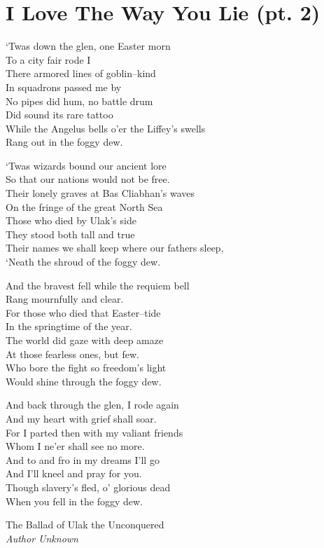 \chapter{I Love The Way You Lie (pt. 2)}
\begin{quotePoem}{
‘Twas down the glen, one Easter morn\\
To a city fair rode I\\
There armored lines of goblin\mbox{--}kind\\
In squadrons passed me by\\
No pipes did hum, no battle drum\\
Did sound its rare tattoo\\
While the Angelus bells o’er the Liffey’s swells\\
Rang out in the foggy dew.

‘Twas wizards bound our ancient lore\\
So that our nations would not be free.\\
Their lonely graves at Bas Cliabhan’s waves\\
On the fringe of the great North Sea\\
Those who died by Ulak’s side\\
They stood both tall and true\\
Their names we shall keep where our fathers sleep,\\
‘Neath the shroud of the foggy dew.

And the bravest fell while the requiem bell\\
Rang mournfully and clear.\\
For those who died that Easter\mbox{--}tide\\
In the springtime of the year.\\
The world did gaze with deep amaze\\
At those fearless ones, but few.\\
Who bore the fight so freedom’s light\\
Would shine through the foggy dew.

And back through the glen, I rode again\\
And my heart with grief shall soar.\\
For I parted then with my valiant friends\\
Whom I ne’er shall see no more.\\
And to and fro in my dreams I’ll go\\
And I’ll kneel and pray for you.\\
Though slavery’s fled, o’ glorious dead\\
When you fell in the foggy dew.}
{The Ballad of Ulak the Unconquered\\
\emph{Author Unknown}}
\end{quotePoem}\normalsize
\simpleline

